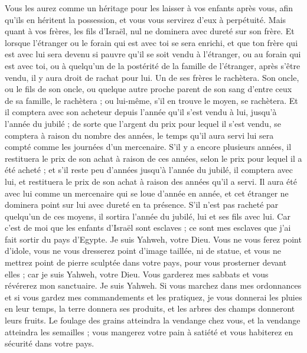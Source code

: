 \begin{multicols}{2}
Vous les aurez comme un héritage pour les laisser à vos enfants après vous, afin qu'ils en héritent la possession, et vous vous servirez d'eux à perpétuité. Mais quant à vos frères, les fils d'Israël, nul ne dominera avec dureté sur son frère.
Et lorsque l'étranger ou le forain qui est avec toi se sera enrichi, et que ton frère qui est avec lui sera devenu si pauvre qu'il se soit vendu à l'étranger, ou au forain qui est avec toi, ou à quelqu'un de la postérité de la famille de l'étranger,
après s'être vendu, il y aura droit de rachat pour lui. Un de ses frères le rachètera.
Son oncle, ou le fils de son oncle, ou quelque autre proche parent de son sang d'entre ceux de sa famille, le rachètera ; ou lui-même, s'il en trouve le moyen, se rachètera.
Et il comptera avec son acheteur depuis l'année qu'il s'est vendu à lui, jusqu'à l'année du jubilé ; de sorte que l'argent du prix pour lequel il s'est vendu, se comptera à raison du nombre des années, le temps qu'il aura servi lui sera compté comme les journées d'un mercenaire.
S'il y a encore plusieurs années, il restituera le prix de son achat à raison de ces années, selon le prix pour lequel il a été acheté ;
et s'il reste peu d'années jusqu'à l'année du jubilé, il comptera avec lui, et restituera le prix de son achat à raison des années qu'il a servi.
Il aura été avec lui comme un mercenaire qui se loue d'année en année, et cet étranger ne dominera point sur lui avec dureté en ta présence.
S'il n'est pas racheté par quelqu'un de ces moyens, il sortira l'année du jubilé, lui et ses fils avec lui.
Car c'est de moi que les enfants d'Israël sont esclaves ; ce sont mes esclaves que j'ai fait sortir du pays d'Egypte. Je suis Yahweh, votre Dieu.
\VerseOne{}Vous ne vous ferez point d'idole, vous ne vous dresserez point d'image taillée, ni de statue, et vous ne mettrez point de pierre sculptée dans votre pays, pour vous prosterner devant elles ; car je suis Yahweh, votre Dieu.
Vous garderez mes sabbats et vous révérerez mon sanctuaire. Je suis Yahweh.
Si vous marchez dans mes ordonnances et si vous gardez mes commandements et les pratiquez,
je vous donnerai les pluies en leur temps, la terre donnera ses produits, et les arbres des champs donneront leurs fruits.
Le foulage des grains atteindra la vendange chez vous, et la vendange atteindra les semailles ; vous mangerez votre pain à satiété et vous habiterez en sécurité dans votre pays.

\end{multicols}
